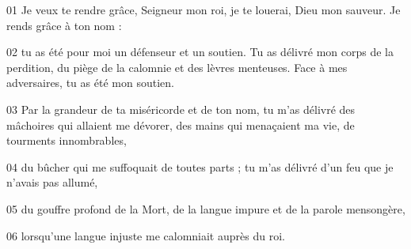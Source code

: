 01 Je veux te rendre grâce, Seigneur mon roi, je te louerai, Dieu mon sauveur. Je rends grâce à ton nom :

02 tu as été pour moi un défenseur et un soutien. Tu as délivré mon corps de la perdition, du piège de la calomnie et des lèvres menteuses. Face à mes adversaires, tu as été mon soutien.

03 Par la grandeur de ta miséricorde et de ton nom, tu m’as délivré des mâchoires qui allaient me dévorer, des mains qui menaçaient ma vie, de tourments innombrables,

04 du bûcher qui me suffoquait de toutes parts ; tu m’as délivré d’un feu que je n’avais pas allumé,

05 du gouffre profond de la Mort, de la langue impure et de la parole mensongère,

06 lorsqu’une langue injuste me calomniait auprès du roi.